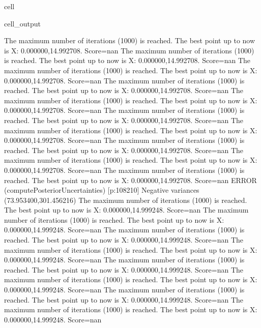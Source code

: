 \documentclass[letterpaper,10pt,english]{jupyterBook}
\begin{document}
\begin{sphinxuseclass}{cell}
\begin{sphinxVerbatimOutput}
\begin{sphinxuseclass}{cell_output}
\begin{sphinxVerbatim}[commandchars=\\\{\}]
The maximum number of iterations (1000) is reached. The best point up to now is X: \PYGZob{}0.000000,14.992708\PYGZcb{}. Score=\PYGZhy{}nan
The maximum number of iterations (1000) is reached. The best point up to now is X: \PYGZob{}0.000000,14.992708\PYGZcb{}. Score=\PYGZhy{}nan
The maximum number of iterations (1000) is reached. The best point up to now is X: \PYGZob{}0.000000,14.992708\PYGZcb{}. Score=\PYGZhy{}nan
The maximum number of iterations (1000) is reached. The best point up to now is X: \PYGZob{}0.000000,14.992708\PYGZcb{}. Score=\PYGZhy{}nan
The maximum number of iterations (1000) is reached. The best point up to now is X: \PYGZob{}0.000000,14.992708\PYGZcb{}. Score=\PYGZhy{}nan
The maximum number of iterations (1000) is reached. The best point up to now is X: \PYGZob{}0.000000,14.992708\PYGZcb{}. Score=\PYGZhy{}nan
The maximum number of iterations (1000) is reached. The best point up to now is X: \PYGZob{}0.000000,14.992708\PYGZcb{}. Score=\PYGZhy{}nan
The maximum number of iterations (1000) is reached. The best point up to now is X: \PYGZob{}0.000000,14.992708\PYGZcb{}. Score=\PYGZhy{}nan
The maximum number of iterations (1000) is reached. The best point up to now is X: \PYGZob{}0.000000,14.992708\PYGZcb{}. Score=\PYGZhy{}nan
The maximum number of iterations (1000) is reached. The best point up to now is X: \PYGZob{}0.000000,14.992708\PYGZcb{}. Score=\PYGZhy{}nan
ERROR (compute\PYGZus{}Posterior\PYGZus{}Uncertainties) [p:108210] Negative variances (\PYGZhy{}73.953400,301.456216)
The maximum number of iterations (1000) is reached. The best point up to now is X: \PYGZob{}0.000000,14.999248\PYGZcb{}. Score=\PYGZhy{}nan
The maximum number of iterations (1000) is reached. The best point up to now is X: \PYGZob{}0.000000,14.999248\PYGZcb{}. Score=\PYGZhy{}nan
The maximum number of iterations (1000) is reached. The best point up to now is X: \PYGZob{}0.000000,14.999248\PYGZcb{}. Score=\PYGZhy{}nan
The maximum number of iterations (1000) is reached. The best point up to now is X: \PYGZob{}0.000000,14.999248\PYGZcb{}. Score=\PYGZhy{}nan
The maximum number of iterations (1000) is reached. The best point up to now is X: \PYGZob{}0.000000,14.999248\PYGZcb{}. Score=\PYGZhy{}nan
The maximum number of iterations (1000) is reached. The best point up to now is X: \PYGZob{}0.000000,14.999248\PYGZcb{}. Score=\PYGZhy{}nan
The maximum number of iterations (1000) is reached. The best point up to now is X: \PYGZob{}0.000000,14.999248\PYGZcb{}. Score=\PYGZhy{}nan
The maximum number of iterations (1000) is reached. The best point up to now is X: \PYGZob{}0.000000,14.999248\PYGZcb{}. Score=\PYGZhy{}nan

\end{sphinxVerbatim}
\end{sphinxuseclass}
\end{sphinxVerbatimOutput}
\end{sphinxuseclass}
\end{document}
